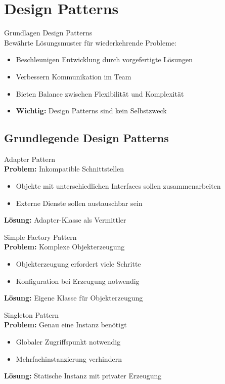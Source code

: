 \section{Design Patterns}

\begin{concept}{Grundlagen Design Patterns}\\
Bewährte Lösungsmuster für wiederkehrende Probleme:
\begin{itemize}
    \item Beschleunigen Entwicklung durch vorgefertigte Lösungen
    \item Verbessern Kommunikation im Team
    \item Bieten Balance zwischen Flexibilität und Komplexität
    \item \textbf{Wichtig:} Design Patterns sind kein Selbstzweck
\end{itemize}
\end{concept}

\subsection{Grundlegende Design Patterns}

\begin{definition}{Adapter Pattern}\\
\textbf{Problem:} Inkompatible Schnittstellen
\begin{itemize}
    \item Objekte mit unterschiedlichen Interfaces sollen zusammenarbeiten
    \item Externe Dienste sollen austauschbar sein
\end{itemize}
\textbf{Lösung:} Adapter-Klasse als Vermittler
\end{definition}

\begin{definition}{Simple Factory Pattern}\\
\textbf{Problem:} Komplexe Objekterzeugung
\begin{itemize}
    \item Objekterzeugung erfordert viele Schritte
    \item Konfiguration bei Erzeugung notwendig
\end{itemize}
\textbf{Lösung:} Eigene Klasse für Objekterzeugung
\end{definition}

\begin{definition}{Singleton Pattern}\\
\textbf{Problem:} Genau eine Instanz benötigt
\begin{itemize}
    \item Globaler Zugriffspunkt notwendig
    \item Mehrfachinstanzierung verhindern
\end{itemize}
\textbf{Lösung:} Statische Instanz mit privater Erzeugung
\end{definition}

